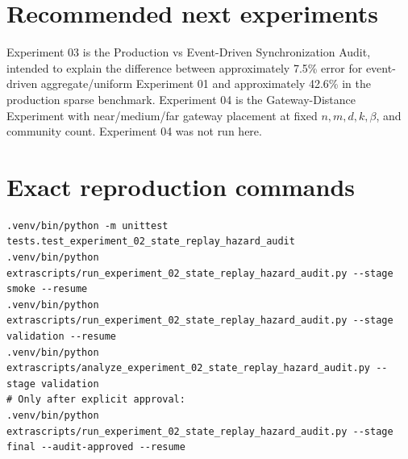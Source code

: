 \documentclass[11pt]{article}
\begin{document}
\section{Recommended next experiments}
Experiment 03 is the Production vs Event-Driven Synchronization Audit, intended to explain the difference between approximately 7.5\% error for event-driven aggregate/uniform Experiment 01 and approximately 42.6\% in the production sparse benchmark. Experiment 04 is the Gateway-Distance Experiment with near/medium/far gateway placement at fixed $n,m,d,k,\beta$, and community count. Experiment 04 was not run here.

\section{Exact reproduction commands}
\begin{verbatim}
.venv/bin/python -m unittest tests.test_experiment_02_state_replay_hazard_audit
.venv/bin/python extrascripts/run_experiment_02_state_replay_hazard_audit.py --stage smoke --resume
.venv/bin/python extrascripts/run_experiment_02_state_replay_hazard_audit.py --stage validation --resume
.venv/bin/python extrascripts/analyze_experiment_02_state_replay_hazard_audit.py --stage validation
# Only after explicit approval:
.venv/bin/python extrascripts/run_experiment_02_state_replay_hazard_audit.py --stage final --audit-approved --resume
\end{verbatim}
\end{document}
